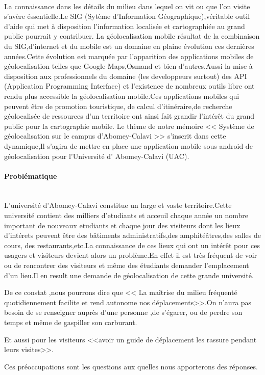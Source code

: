\introduction
      \paragraph{}
      \small{
	La connaissance dans les détails du milieu dans lequel on vit ou que l'on visite 
    s'avère éssentielle.Le SIG (Sytème d'Information Géographique),véritable outil d'aide 
    qui met à disposition l'information localisée et cartographiée au grand public pourrait
    y contribuer.
	La géolocalisation mobile résultat de la combinaison du SIG,d'internet et du mobile
    est un domaine en plaine évolution ces dernières années.Cette évolution est marquée par 
    l'apparition des applications mobiles de géolocalisation telles que Google Maps,Osmand 
    et bien d'autres.Aussi la mise à disposition aux professionnels du domaine (les developpeurs surtout)
    des API (Application Programming Interface) et l'existence de nombreux outils libre ont rendu plus 
    accessible la géolocalisation mobile.Ces applications mobiles qui peuvent être de promotion touristique,
    de calcul d'itinéraire,de recherche géolocalisée de ressources d'un territoire ont ainsi fait grandir
    l'intérêt du grand public pour la cartographie mobile. 
	Le thème de notre mémoire << Système de géolocalisation sur le campus d'Abomey-Calavi >> s'inscrit dans 
    cette dynamique,Il s'agira de mettre en place une application mobile sous android de géolocalisation pour l'Université
    d' Abomey-Calavi (UAC).}
    
    \paragraph{Problématique\\ \\}
    \small{ 
	L'université d'Abomey-Calavi constitue un large et vaste territoire.Cette université contient des milliers 
     d'etudiants et acceuil chaque année un nombre important de nouveaux etudiants et chaque jour des visiteurs 
     dont les lieux d'intérets peuvent être des bâtiments administratifs,des amphitéâtres,des salles de cours,
     des restaurants,etc.La connaissance de ces lieux qui ont un intérêt pour ces usagers et visiteurs devient 
     alors un problème.En effet il est très fréquent de voir ou de rencontrer des visiteurs et même des étudiants 
     demander l'emplacement d'un lieu.Il en result une demande de géolocalisation de cette grande université.

	  De ce constat ,nous pourrons dire que << La maîtrise du milieu fréquenté quotidiennement facilite 
      et rend autonome nos déplacements>>.On n'aura pas besoin de se renseigner auprès d'une personne ,de s'égarer,
      ou de perdre son temps et même de gaspiller son carburant.

	  Et aussi pour les visiteurs <<avoir un guide de déplacement les rassure pendant leurs visites>>.

	  Ces préoccupations sont les questions aux quelles nous apporterons des réponses.\\ \\}

